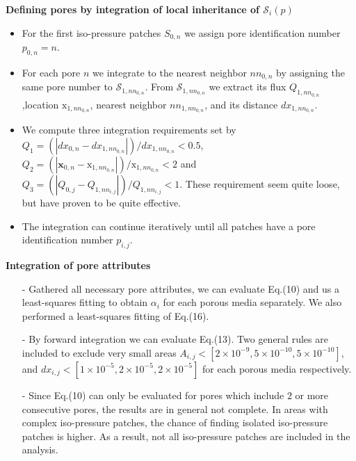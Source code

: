 \documentclass[draft,jgrga]{agutexSI2019}
\begin{document}
\begin{article}
\noindent\textbf{Defining pores by integration of local inheritance of $\mathcal{S}_i(p)$}
\begin{itemize}
	\item For the first iso-pressure patches $S_{0,n}$ we assign pore identification number $p_{0,n} = n$. 
	\item For each pore $n$ we integrate to the nearest neighbor $nn_{0,n}$ by assigning the same pore number to $\mathcal{S}_{1,nn_{0,n}}$. From $\mathcal{S}_{1,nn_{0,n}}$ we extract its flux $Q_{1,nn_{0,n}}$,location $\mathrm{x}_{1,nn_{0,n}}$, nearest neighbor $nn_{1,nn_{0,n}}$, and its distance $dx_{1,nn_{0,n}}$.
	\item We compute three integration requirements set by $Q_1 = (|dx_{0,n}-dx_{1,nn_{0,n}}|)/dx_{1,nn_{0,n}}<0.5$, $Q_2 = (|\mathbf{x}_{0,n}-\mathrm{x}_{1,nn_{0,n}}|)/\mathrm{x}_{1,nn_{0,n}}<2$ and $Q_3 = (|Q_{0,j}-Q_{1,nn_{i,j}}|)/Q_{1,nn_{i,j}}<1$. These requirement seem quite loose, but have proven to be quite effective. 
	\item The integration can continue iteratively until all patches have a pore identification number $p_{i,j}$.	
\end{itemize}
\noindent\textbf{Integration of pore attributes}
\begin{itemize}
	\item[-]Gathered all necessary pore attributes, we can evaluate Eq.(10) and us a least-squares fitting to obtain $\alpha_i$ for each porous media separately. We also performed a least-squares fitting of Eq.(16).
	\item[-]By forward integration we can evaluate Eq.(13). Two general rules are included to exclude very small areas $A_{i,j}<[2\times10^{-9},5\times10^{-10},5\times10^{-10}]$, and $dx_{i,j}<[1\times10^{-5},2\times10^{-5},2\times10^{-5}]$  for each porous media respectively.
	\item[-]Since Eq.(10) can only be evaluated for pores which include $2$ or more consecutive pores, the results are in general not complete. In areas with complex iso-pressure patches, the chance of finding isolated iso-pressure patches is higher. As a result, not all iso-pressure patches are included in the analysis. 
\end{itemize}



\end{article}
\end{document}
